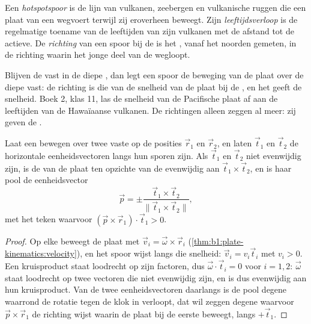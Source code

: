 \begin{definition}\label{def:b1:hotspots:track}
Een \emph{hotspotspoor} is de lijn van vulkanen, zeebergen en vulkanische ruggen die een plaat van een  wegvoert terwijl zij eroverheen beweegt. Zijn \emph{leeftijdsverloop} is de regelmatige toename van de leeftijden van zijn vulkanen met de afstand tot de actieve. De \emph{richting} van een spoor bij de  is het , vanaf het noorden gemeten, in de richting waarin het jonge deel van de  wegloopt.
\end{definition}

Blijven de  vast in de diepe , dan legt een spoor de beweging van de plaat over de diepe  vast: de richting is die van de snelheid van de plaat bij de , en het  geeft de snelheid. Boek 2, klas 11, las de snelheid van de Pacifische plaat af aan de leeftijden van de Hawaïaanse vulkanen. De richtingen alleen zeggen al meer: zij geven de .

\begin{proposition}\label{prop:b1:hotspots:two-tracks}
Laat een  bewegen over twee vaste  op de posities $\vec r_1$ en $\vec r_2$, en laten $\vec t_1$ en $\vec t_2$ de horizontale eenheidsvectoren langs hun sporen zijn. Als $\vec t_1$ en $\vec t_2$ niet evenwijdig zijn, is de  van de plaat ten opzichte van de  evenwijdig aan $\vec t_1\times\vec t_2$, en is haar pool de eenheidsvector
\[
  \vec p = \pm\frac{\vec t_1\times\vec t_2}{\lVert\vec t_1\times\vec t_2\rVert},
\]
met het teken waarvoor $(\vec p\times\vec r_1)\cdot\vec t_1 > 0$.
\end{proposition}

\begin{proof}
Op elke  beweegt de plaat met $\vec v_i = \vec\omega\times\vec r_i$ (\cref{thm:b1:plate-kinematics:velocity}), en het spoor wijst langs die snelheid: $\vec v_i = v_i\vec t_i$ met $v_i > 0$. Een kruisproduct staat loodrecht op zijn factoren, dus $\vec\omega\cdot\vec t_i = 0$ voor $i = 1, 2$: $\vec\omega$ staat loodrecht op twee vectoren die niet evenwijdig zijn, en is dus evenwijdig aan hun kruisproduct. Van de twee eenheidsvectoren daarlangs is de pool degene waarrond de rotatie tegen de klok in verloopt, dat wil zeggen degene waarvoor $\vec p\times\vec r_1$ de richting wijst waarin de plaat bij de eerste  beweegt, langs $+\vec t_1$.
\end{proof}

